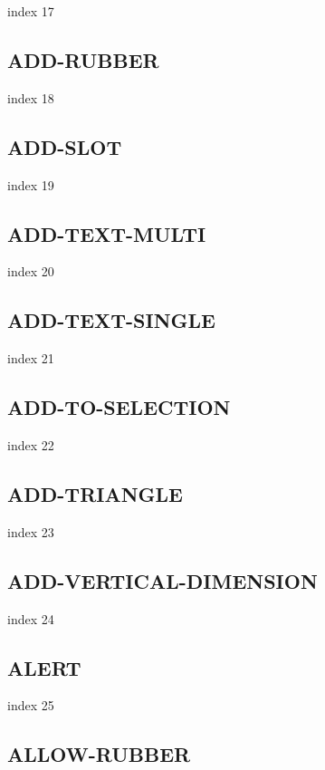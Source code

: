 \documentclass[a4paper]{report}
\begin{document}
index 17

\subsection{ADD-RUBBER}

index 18

\subsection{ADD-SLOT}

index 19

\subsection{ADD-TEXT-MULTI}

index 20

\subsection{ADD-TEXT-SINGLE}

index 21

\subsection{ADD-TO-SELECTION}

index 22

\subsection{ADD-TRIANGLE}

index 23

\subsection{ADD-VERTICAL-DIMENSION}

index 24

\subsection{ALERT}

index 25

\subsection{ALLOW-RUBBER}
\end{document}
